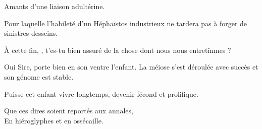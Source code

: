 \begin{drama}
  \alexasspeaks Amants d’une liaison adultérine.

  \elenaspeaks Pour laquelle l’habileté d’un Héphaïstos industrieux ne tardera pas à forger de sinistres desseins.

               À cette fin, \alexas, t’es-tu bien assuré de la chose dont nous nous entretînmes ?
  
  \alexasspeaks Oui Sire, \catin{} porte bien en son ventre l’enfant. La méiose s’est déroulée avec succès et son génome est stable.

  \elenaspeaks Puisse cet enfant vivre longtemps, devenir fécond et prolifique.

  \alexasspeaks
  \begin{minipage}[t]{\linewidth}
    Que ces dires soient reportés aux annales,\\
    En hiéroglyphes et en ossécaille.
  \end{minipage}
\end{drama}

\scene


\StageDirII{\reine, \princesse}



